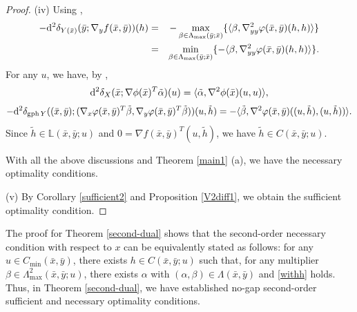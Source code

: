 \documentclass[11pt]{article}
\numberwithin{equation}{section}
\begin{document}
{\begin{proof}
(iv) Using \cite[Proposition 2.3, Proposition 2.5 (ii)(iii)]{Ma2023},
\begin{equation*}
\begin{aligned}
-{\rm d}^2 \delta_{Y(\bar x)}(\bar y;\nabla_yf(\bar x,\bar y))(h) & = & -\max_{\beta \in \Lambda_{\max}(\bar y; \bar x)} \{ \langle \beta, \nabla_{yy}^2 \varphi(\bar x,\bar y)(h,h) \rangle \} \\
& = &\min_{\beta \in \Lambda_{\max}(\bar y; \bar x)} \{- \langle \beta, \nabla_{yy}^2 \varphi(\bar x,\bar y)(h,h) \rangle \}.
\end{aligned}
\end{equation*}
For any $u$, we have, by \cite[Proposition 2.3, Proposition 2.7 (ii)(iii)]{Ma2023}, 
\begin{equation*}
{\rm d}^2 \delta_{X}(\bar x;\nabla \phi(\bar{x})^T\tilde \alpha)(u) = \langle \tilde \alpha, \nabla^2 \phi(\bar x)(u,u) \rangle ,
\end{equation*}
\begin{equation*}
-{\rm d}^2 \delta_{\operatorname{gph}Y}((\bar x,\bar y);(\nabla_x \varphi(\bar x,\bar y)^T\tilde \beta ,\nabla_y \varphi(\bar x,\bar y)^T\tilde \beta))(u,\tilde h) =-\langle \tilde \beta, \nabla^2 \varphi(\bar x,\bar y)(( u,\tilde h),(u,\tilde h)) \rangle .
\end{equation*}
Since $\tilde h \in \mathbb{L}(\bar x,\bar y;u)$ and $0=\nabla f(\bar x,\bar y)^T(u,\tilde h)$, we have $\tilde h \in C(\bar x,\bar y;u)$.

With all the above discussions and Theorem \ref{main1} (a), we have the necessary optimality conditions.

(v) 
 By Corollary \ref{sufficient2} and Proposition \ref{V2diff1}, we obtain the sufficient optimality condition.

\end{proof}


The proof for Theorem \ref{second-dual} shows that the second-order necessary condition with respect to $x$ can be equivalently stated as follows:
	for any $u \in C_{\min}(\bar x,\bar y)$, there exists $h \in C(\bar x,\bar y;u)$ such that, 
	for any multiplier $\beta \in \Lambda^2_{\operatorname{max}}(\bar x,\bar y;u)$, 
	there exists $\alpha$ with $(\alpha,\beta) \in \Lambda(\bar x,\bar y)$ and \eqref{withh} holds. 
	Thus, in Theorem \ref{second-dual}, we have established no-gap second-order sufficient and necessary optimality conditions.



}
\end{document}
